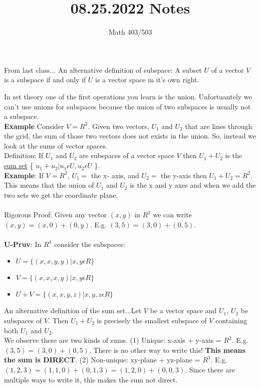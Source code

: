 \documentclass{article}
\title{08.25.2022 Notes}
\author{Math 403/503 }
\begin{document}
\maketitle

From last class... An alternative definition of subspace: A subset $U$ of a vector $V$ is a subspace if and only if $U$ is a vector space in it's own right. 

In set theory one of the first operations you learn is the union. Unfortuantely we can't use unions for subspaces because the union of two subspaces is usually not a subspace. \\

\textbf{Example}
Consider $V=R^2$. Given two vectors, $U_1$ and $U_2$ that are lines through the grid, the sum of those two vectors does not exists in the union. So, instead we look at the sums of vector spaces. \\

Definition: If $U_1$ and $U_2$ are subspaces of a vector space $V$ then $U_1 + U_2$ is the \underline{sum set} \{ $u_1 + u_2 | u_1 \epsilon U, u_2 \epsilon U$ \}. \\

\textbf{Example}: If $V = R^2$, $U_1 =$ the x- axis, and $U_2 =$ the y-axis then $U_1 + U_2 = R^2$. This means that the union of $U_1$ and $U_2$ is the x and y axes and when we add the two sets we get the coordinate plane. \\ \\
Rigorous Proof: Given any vector $(x,y)$ in $R^2$ we can write $(x,y) = (x,0) + (0,y)$. E.g. $(3,5) = (3,0) + (0,5)$. \\ \\ 

\textbf{U-Pruv}: In $R^4$ consider the subspaces: 
\begin{itemize}
    \item $U = \{(x, x, y, y) | x, y \epsilon R\}$
    \item $V = \{(x, x, x, y) | x,y \epsilon R \}$
    \item $U + V = \{(x, x, y, z) | x, y, z \epsilon R \}$
\end{itemize}

An alternative definition of the sum set...Let $V$ be a vector space and $U_1$, $U_2$ be subspaces of $V$. Then $U_1 + U_2$ is precisely the smallest subspace of $V$ containing both $U_1$ and $U_2$.\\

We observe there are two kinds of sums. (1) Unique: x-axis + y-axis = $R^2$. E.g. $(3,5) = (3, 0) + (0,5)$. There is no other way to write this! \textbf{This means the sum is DIRECT}. (2) Non-unique: xy-plane + yz-plane = $R^3$. E.g. $(1, 2, 3) = (1, 1, 0) + (0, 1, 3) = (1, 2, 0) + (0, 0, 3)$. Since there are multiple ways to write it, this makes the sum not direct. \\
\end{document}
